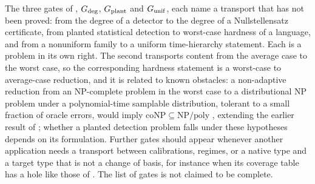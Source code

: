 The three gates of ,
\(G_{\mathrm{deg}}\), \(G_{\mathrm{plant}}\) and
\(G_{\mathrm{unif}}\), each name a transport that has not been proved: from the degree of a
detector to the degree of a Nullstellensatz certificate, from planted
statistical detection to worst-case hardness of a language, and from a
nonuniform family to a uniform time-hierarchy statement.  Each is a
problem in its own right.  The second transports content from the
average case to the worst case, so the corresponding hardness statement
is a worst-case to average-case reduction, and it is related to known
obstacles: a
non-adaptive reduction from an NP-complete problem in the worst case to
a distributional NP problem under a polynomial-time samplable
distribution, tolerant to a small fraction of oracle errors, would
imply \(\mathrm{coNP}\subseteq\mathrm{NP/poly}\)
\cite{BogdanovTrevisan2006WorstAverage}, extending the earlier result
of \cite{FeigenbaumFortnow1993RandomSelfReducibility}; whether a
planted detection problem falls under these hypotheses depends on its
formulation.  Further gates should appear whenever another
application needs a transport between calibrations, regimes, or a
native type and a target type that is not a change of basis, for
instance when its coverage table has a hole like those of
.  The list of gates is not claimed
to be complete.

